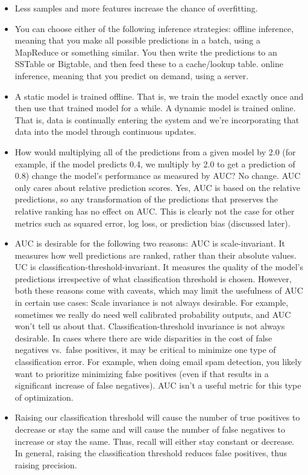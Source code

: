 \documentclass[]{book}
\begin{document}
\begin{itemize}
\item
  Less samples and more features increase the chance of overfitting.
\item
  You can choose either of the following inference strategies: offline inference, meaning that you make all possible predictions in a batch, using a MapReduce or something similar. You then write the predictions to an SSTable or Bigtable, and then feed these to a cache/lookup table. online inference, meaning that you predict on demand, using a server.
\item
  A static model is trained offline. That is, we train the model exactly once and then use that trained model for a while. A dynamic model is trained online. That is, data is continually entering the system and we're incorporating that data into the model through continuous updates.
\item
  How would multiplying all of the predictions from a given model by 2.0 (for example, if the model predicts 0.4, we multiply by 2.0 to get a prediction of 0.8) change the model's performance as measured by AUC? No change. AUC only cares about relative prediction scores. Yes, AUC is based on the relative predictions, so any transformation of the predictions that preserves the relative ranking has no effect on AUC. This is clearly not the case for other metrics such as squared error, log loss, or prediction bias (discussed later).
\item
  AUC is desirable for the following two reasons: AUC is scale-invariant. It measures how well predictions are ranked, rather than their absolute values. UC is classification-threshold-invariant. It measures the quality of the model's predictions irrespective of what classification threshold is chosen. However, both these reasons come with caveats, which may limit the usefulness of AUC in certain use cases: Scale invariance is not always desirable. For example, sometimes we really do need well calibrated probability outputs, and AUC won't tell us about that. Classification-threshold invariance is not always desirable. In cases where there are wide disparities in the cost of false negatives vs.~false positives, it may be critical to minimize one type of classification error. For example, when doing email spam detection, you likely want to prioritize minimizing false positives (even if that results in a significant increase of false negatives). AUC isn't a useful metric for this type of optimization.
\item
  Raising our classification threshold will cause the number of true positives to decrease or stay the same and will cause the number of false negatives to increase or stay the same. Thus, recall will either stay constant or decrease. In general, raising the classification threshold reduces false positives, thus raising precision.

\end{itemize}
\end{document}
